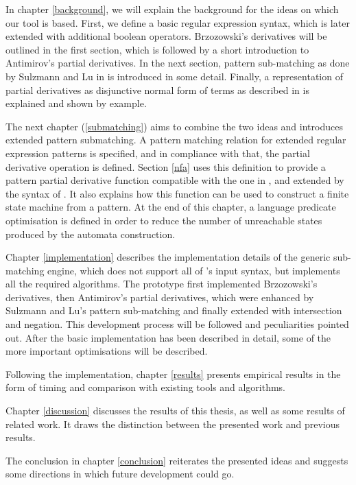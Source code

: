 In chapter \ref{background}, we will explain the background for the ideas on
which our tool is based. First, we define a basic regular expression syntax,
which is later extended with additional boolean operators. Brzozowski's
derivatives will be outlined in the first section, which is followed by a short
introduction to Antimirov's partial derivatives. In the next section, pattern
sub-matching as done by Sulzmann and Lu in \cite{pdpat} is introduced in some
detail. Finally, a representation of partial derivatives as disjunctive normal
form of terms as described in \cite{pdere} is explained and shown by example.

The next chapter (\ref{submatching}) aims to combine the two ideas and
introduces extended pattern submatching. A pattern matching relation for
extended regular expression patterns is specified, and in compliance with that,
the partial derivative operation is defined. Section \ref{nfa} uses this
definition to provide a pattern partial derivative function compatible with the
one in \cite{pdpat}, and extended by the syntax of \cite{pdere}. It also
explains how this function can be used to construct a finite state machine from
a pattern. At the end of this chapter, a language predicate optimisation is
defined in order to reduce the number of unreachable states produced by the
automata construction.

Chapter \ref{implementation} describes the implementation details of the generic
sub-matching engine, which does not support all of \reml's input syntax, but
implements all the required algorithms. The prototype first implemented
Brzozowski's derivatives, then Antimirov's partial derivatives, which were
enhanced by Sulzmann and Lu's pattern sub-matching and finally extended with
intersection and negation. This development process will be followed and
peculiarities pointed out. After the basic implementation has been described in
detail, some of the more important optimisations will be described.

Following the implementation, chapter \ref{results} presents empirical results
in the form of timing and comparison with existing tools and algorithms.

Chapter \ref{discussion} discusses the results of this thesis, as well as some
results of related work. It draws the distinction between the presented work and
previous results.

The conclusion in chapter \ref{conclusion} reiterates the presented ideas and
suggests some directions in which future development could go.


